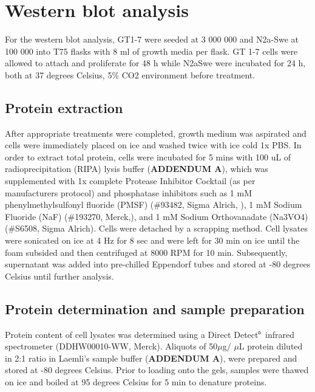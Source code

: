 \section{Western blot analysis}
For the western blot analysis, GT1-7 were seeded at 3 000 000 and N2a-Swe at 100 000 into T75 flasks with 8 ml of growth media per flask. GT 1-7 cells were allowed to attach and proliferate for 48 h while N2aSwe were incubated for 24 h, both at 37 degrees Celsius, 5\% CO2 environment before treatment.

\subsection{Protein extraction}
After appropriate treatments were completed, growth medium was aspirated and cells were immediately placed on ice and washed twice with ice cold 1x PBS. In order to extract total protein, cells were incubated for 5 mins with 100 uL of radioprecipitation (RIPA) lysis buffer (\textbf{ADDENDUM A}), which was supplemented with 1x complete Protease Inhibitor Cocktail (as per manufacturers protocol) and phosphatase inhibitors such as 1 mM phenylmethylsulfonyl fluoride (PMSF) (\#93482, Sigma Alrich, ), 1 mM Sodium Fluoride (NaF) (\#193270, Merck,), and 1 mM Sodium Orthovanadate (Na3VO4) (\#S6508, Sigma Alrich). Cells were detached by a scrapping method. Cell lysates were sonicated on ice at 4 Hz for 8 sec and were left for 30 min on ice until the foam subsided and then centrifuged at 8000 RPM for 10 min. Subsequently, supernatant was added into pre-chilled Eppendorf tubes and stored at -80 degrees Celsius until further analysis.

\subsection{Protein determination and sample preparation}
Protein content of cell lysates was determined using a Direct Detect${\textsuperscript{\tiny{\textregistered}}}$ infrared spectrometer (DDHW00010-WW, Merck). Aliquots of 50$\mu$g/ $\mu$L protein diluted in 2:1 ratio in Laemli’s sample buffer (\textbf{ADDENDUM A}), were prepared and stored at -80 degrees Celsius. Prior to loading onto the gels, samples were thawed on ice and boiled at 95 degrees Celsius for 5 min to denature proteins.

